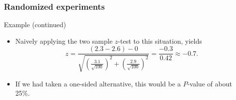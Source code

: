\documentclass[handout]{beamer}
\begin{document}

   \begin{frame} \frametitle{Randomized experiments}

   \begin{block}
   {Example (continued)}
   \begin{itemize}
   \item Naively applying the two sample
   $z$-test to this situation, yields
   $$
   z = \frac{(2.3 - 2.6) - 0}{\sqrt{\left(\frac{3.1}{\sqrt{100}}\right)^2 + \left(\frac{2.9}{\sqrt{100}}\right)^2}} = \frac{-0.3}{0.42} \approx -0.7.
   $$


   \item If we had taken a one-sided alternative, this would be a $P$-value of about 25\%.

   \end{itemize}
   \end{block}
   \end{frame}

\end{document}
